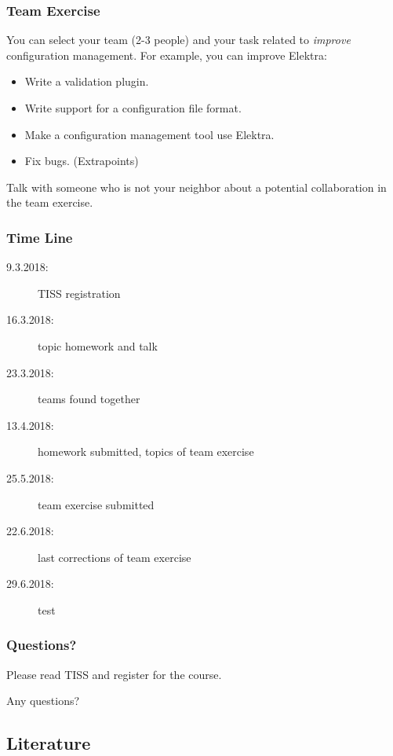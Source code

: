 \documentclass{beamer}
\begin{document}
\begin{frame}
	\frametitle{Team Exercise}
	You can select your team (2-3 people) and your task related to \emph{improve} configuration management.
	For example, you can improve Elektra:
	\begin{itemize}
		\item Write a validation plugin.
		\item Write support for a configuration file format.
		\item Make a configuration management tool use Elektra.
		\item Fix bugs. (Extrapoints)
	\end{itemize}
\end{frame}

\begin{assignment}
	\begin{task}
	Talk with someone who is not your neighbor about a potential collaboration in the team exercise.
	\end{task}
\end{assignment}

\begin{frame}
	\frametitle{Time Line}
	\begin{description}
		\item[9.3.2018:] TISS registration
		\item[16.3.2018:] topic homework and talk
		\item[23.3.2018:] teams found together
		\item[13.4.2018:] homework submitted, topics of team exercise
		\item[25.5.2018:] team exercise submitted
		\item[22.6.2018:] last corrections of team exercise
		\item[29.6.2018:] test
	\end{description}
\end{frame}

\begin{assignment}
	\frametitle{Questions?}
	\begin{task}
	Please read TISS and register for the course.
	\end{task}

	\begin{task}
	Any questions?
	\end{task}
\end{assignment}



\subsection{Literature}

\nocite{raab2017introducing}

\begin{frame}[allowframebreaks]
	
	
\end{frame}
\end{document}
